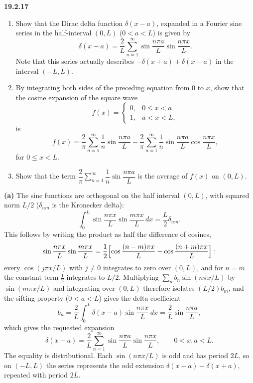 \par\bigskip
\noindent\textbf{19.2.17}
\begin{enumerate}
\item[(a)] Show that the Dirac delta function $\delta(x-a)$,
expanded in a Fourier sine series in the half-interval $(0,L)$
($0<a<L$) is given by
\[
\delta(x-a)=\frac{2}{L}\sum_{n=1}^{\infty}
\sin\frac{n\pi a}{L}\sin\frac{n\pi x}{L}.
\]
Note that this series actually describes
$-\delta(x+a)+\delta(x-a)$ in the interval $(-L,L)$.
\item[(b)] By integrating both sides of the preceding equation
from $0$ to $x$, show that the cosine expansion of the square wave
\[
f(x)=\begin{cases}
0, & 0\le x<a\\
1, & a<x<L,
\end{cases}
\]
is
\[
f(x)=\frac{2}{\pi}\sum_{n=1}^{\infty}\frac{1}{n}
\sin\frac{n\pi a}{L}-\frac{2}{\pi}\sum_{n=1}^{\infty}\frac{1}{n}
\sin\frac{n\pi a}{L}\cos\frac{n\pi x}{L},
\]
for $0\le x<L$.
\item[(c)] Show that the term
$\dfrac{2}{\pi}\displaystyle\sum_{n=1}^{\infty}\dfrac{1}{n}
\sin\dfrac{n\pi a}{L}$ is the average of $f(x)$ on $(0,L)$.
\end{enumerate}
\solution
\textbf{(a)} The sine functions are orthogonal on the half interval
$(0,L)$, with squared norm $L/2$ ($\delta_{nm}$ is the Kronecker delta):
\[
\int_0^L\sin\frac{n\pi x}{L}\sin\frac{m\pi x}{L}\,dx
=\frac L2\delta_{nm}.
\]
This follows by writing the product as half the difference of cosines,
\[
\sin\frac{n\pi x}{L}\sin\frac{m\pi x}{L}
=\frac12\Bigl[\cos\frac{(n-m)\pi x}{L}-\cos\frac{(n+m)\pi x}{L}\Bigr]:
\]
every $\cos(j\pi x/L)$ with $j\ne0$ integrates to zero over $(0,L)$, and
for $n=m$ the constant term $\frac12$ integrates to $L/2$. Multiplying
$\sum_nb_n\sin(n\pi x/L)$ by $\sin(m\pi x/L)$ and integrating over
$(0,L)$ therefore isolates
$(L/2)b_m$, and the sifting property ($0<a<L$) gives the delta
coefficient
\[
b_n=\frac2L\int_0^L\delta(x-a)\sin\frac{n\pi x}{L}\,dx
=\frac2L\sin\frac{n\pi a}{L},
\]
which gives the requested expansion
\[
\boxed{\delta(x-a)=\frac2L\sum_{n=1}^{\infty}
\sin\frac{n\pi a}{L}\sin\frac{n\pi x}{L},\qquad0<x,a<L.}
\]
The equality is distributional. Each $\sin(n\pi x/L)$ is odd and has
period $2L$, so on $(-L,L)$ the series represents the odd extension
$\delta(x-a)-\delta(x+a)$, repeated with period $2L$.


